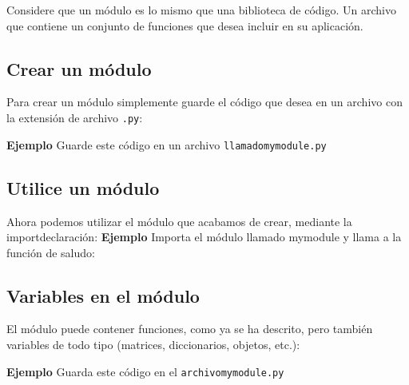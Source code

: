 Considere que un módulo es lo mismo que una biblioteca de código. Un
archivo que contiene un conjunto de funciones que desea incluir en su
aplicación.

\subsection{Crear un módulo}\label{crear-un-muxf3dulo}

Para crear un módulo simplemente guarde el código que desea en un
archivo con la extensión de archivo \texttt{.py}:

\textbf{Ejemplo} Guarde este código en un archivo
\texttt{llamadomymodule.py}

\begin{Shaded}
\begin{Highlighting}[]
    \NormalTok{(} \OperatorTok{+}
\end{Highlighting}
\end{Shaded}

\subsection{Utilice un módulo}\label{utilice-un-muxf3dulo}

Ahora podemos utilizar el módulo que acabamos de crear, mediante la
importdeclaración: \textbf{Ejemplo} Importa el módulo llamado mymodule y
llama a la función de saludo:

\begin{Shaded}
\begin{Highlighting}[]

\NormalTok{)}
\end{Highlighting}
\end{Shaded}

\subsection{Variables en el módulo}\label{variables-en-el-muxf3dulo}

El módulo puede contener funciones, como ya se ha descrito, pero también
variables de todo tipo (matrices, diccionarios, objetos, etc.):

\textbf{Ejemplo} Guarda este código en el \texttt{archivomymodule.py}

\begin{Shaded}
\begin{Highlighting}[]
\OperatorTok{=}\NormalTok{ \{}
    \NormalTok{: }\NormalTok{,}
    \NormalTok{: }\NormalTok{,}
    \NormalTok{: }
\NormalTok{\}}
\end{Highlighting}
\end{Shaded}

